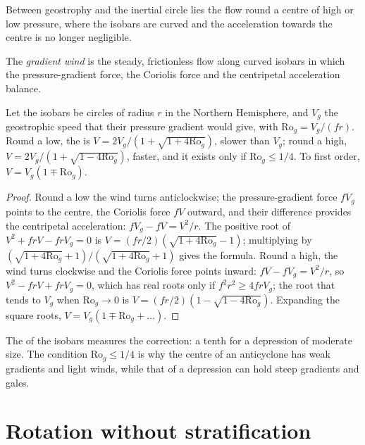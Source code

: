 Between geostrophy and the inertial circle lies the flow round a centre of
high or low pressure, where the isobars are curved and the acceleration
towards the centre is no longer negligible.

\begin{definition}\label{def:b3:gfd-foundations:gradient}
The \emph{gradient wind} is the steady, frictionless
flow along curved isobars in which the pressure-gradient force, the
Coriolis force and the centripetal acceleration balance.
\end{definition}

\begin{proposition}\label{prop:b3:gfd-foundations:gradient}
Let the isobars be circles of radius $r$ in the Northern Hemisphere, and
$V_g$ the geostrophic speed that their pressure gradient would give, with
$\mathrm{Ro}_g = V_g/(fr)$. Round a low, the  is
$V = 2V_g/(1 + \sqrt{1 + 4\mathrm{Ro}_g})$, slower than $V_g$; round a
high, $V = 2V_g/(1 + \sqrt{1 - 4\mathrm{Ro}_g})$, faster, and it exists only
if $\mathrm{Ro}_g \le 1/4$. To first order, $V = V_g(1 \mp \mathrm{Ro}_g)$.
\end{proposition}

\begin{proof}
Round a low the wind turns anticlockwise; the pressure-gradient force
$fV_g$ points to the centre, the Coriolis force $fV$ outward, and their
difference provides the centripetal acceleration: $fV_g - fV = V^2/r$. The
positive root of $V^2 + frV - frV_g = 0$ is $V = (fr/2)(\sqrt{1 +
4\mathrm{Ro}_g} - 1)$; multiplying by $(\sqrt{1 + 4\mathrm{Ro}_g} +
1)/(\sqrt{1 + 4\mathrm{Ro}_g} + 1)$ gives the formula. Round a high, the
wind turns clockwise and the Coriolis force points inward: $fV - fV_g =
V^2/r$, so $V^2 - frV + frV_g = 0$, which has real roots only if $f^2r^2
\ge 4frV_g$; the root that tends to $V_g$ when $\mathrm{Ro}_g \to 0$ is
$V = (fr/2)(1 - \sqrt{1 - 4\mathrm{Ro}_g})$. Expanding the square roots,
$V = V_g(1 \mp \mathrm{Ro}_g + \dots)$.
\end{proof}

The  of the isobars measures the correction: a tenth for a
depression of moderate size. The condition $\mathrm{Ro}_g \le 1/4$ is why
the centre of an anticyclone has weak gradients and light winds, while
that of a depression can hold steep gradients and gales.

\section{Rotation without stratification}\label{sec:b3:gfd-foundations:taylor}

